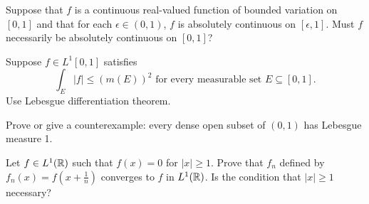 \begin{list}
\item Suppose that $f$ is a continuous real-valued function of bounded variation on $[0,1]$ and that for each $\epsilon \in (0,1)$, $f$ is absolutely continuous on $[\epsilon, 1]$. Must $f$ necessarily be absolutely continuous on $[0,1]$?
\item Suppose $f \in L^1[0,1]$ satisfies 
\[
\int_E |f| \leq (m(E))^2 \text{ for every measurable set } E \subseteq [0,1]. 
 \]
 Use Lebesgue differentiation theorem.
\item Prove or give a counterexample: every dense open subset of $(0,1)$ has Lebesgue measure 1.
\item Let $f \in L^1({\mathbb R})$ such that $f(x)=0$ for $|x|\geq 1$. Prove that $f_n$ defined by $f_n(x)=f\left(x+ \frac{1}{n} \right)$ converges to $f$ in $L^1({\mathbb R})$. Is the condition that $|x|\geq 1$ necessary?
\end{list}